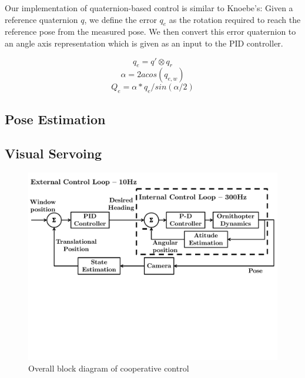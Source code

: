 \documentclass{aamas2013}
\begin{document}
Our implementation of quaternion-based control is similar to Knoebe's\cite{knoebe:quatcontrol}: 
Given a reference quaternion $q$, we define the error $q_e$ as the rotation 
required to reach the reference pose from the measured pose. We then 
convert this error quaternion to an angle axis representation which is given
as an input to the PID controller. 

\begin{equation}
\label{quat_error}
q_e = q'\otimes q_r
\end{equation}
\begin{equation}
\label{quat_angle}
\alpha = 2acos(q_{e,w})
\end{equation}
\begin{equation}
\label{quat_linearize}
Q_e = \alpha*q_e/sin(\alpha /2)
\end{equation}

\subsection{Pose Estimation}

\subsection{Visual Servoing}

\begin{figure}[tb]
\centering
\includegraphics[width=\linewidth]{figures/block_diagrams.pdf}
\caption{Overall block diagram of cooperative control}
\label{fig:block_diagram}
\end{figure}
\end{document}

